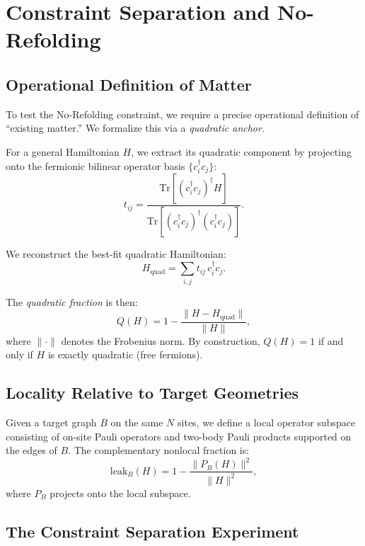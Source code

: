 \documentclass[11pt]{article}
\begin{document}
\section{Constraint Separation and No-Refolding}
\label{sec:constraint_separation}

\subsection{Operational Definition of Matter}

To test the No-Refolding constraint, we require a precise operational definition of ``existing matter.'' We formalize this via a \emph{quadratic anchor}.

For a general Hamiltonian $H$, we extract its quadratic component by projecting onto the fermionic bilinear operator basis $\{c_i^\dagger c_j\}$:
\begin{equation}
t_{ij} = \frac{\text{Tr}\left[(c_i^\dagger c_j)^\dagger H\right]}{\text{Tr}\left[(c_i^\dagger c_j)^\dagger (c_i^\dagger c_j)\right]}.
\end{equation}

We reconstruct the best-fit quadratic Hamiltonian:
\begin{equation}
H_{\text{quad}} = \sum_{i,j} t_{ij}\, c_i^\dagger c_j.
\end{equation}

The \emph{quadratic fraction} is then:
\begin{equation}
Q(H) = 1 - \frac{\|H - H_{\text{quad}}\|}{\|H\|},
\end{equation}
where $\|\cdot\|$ denotes the Frobenius norm. By construction, $Q(H) = 1$ if and only if $H$ is exactly quadratic (free fermions).

\subsection{Locality Relative to Target Geometries}

Given a target graph $B$ on the same $N$ sites, we define a local operator subspace consisting of on-site Pauli operators and two-body Pauli products supported on the edges of $B$. The complementary nonlocal fraction is:
\begin{equation}
\text{leak}_B(H) = 1 - \frac{\|P_B(H)\|^2}{\|H\|^2},
\end{equation}
where $P_B$ projects onto the local subspace.

\subsection{The Constraint Separation Experiment}
\end{document}
